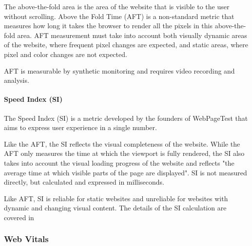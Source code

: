 The above-the-fold area is the area of the website that is visible to the user without scrolling.
Above the Fold Time (AFT) is a non-standard metric that measures how long it takes the browser to render all the pixels in this above-the-fold area. %
AFT measurement must take into account both visually dynamic areas of the website, where frequent pixel changes are expected, and static areas, where pixel and color changes are not expected. %

AFT is measurable by synthetic monitoring and requires video recording and analysis. %


\paragraph{Speed Index (SI)} %

The Speed Index (SI) is a metric developed by the founders of WebPageTest that aims to express user experience in a single number. %

Like the AFT, the SI reflects the visual completeness of the website.
While the AFT only measures the time at which the viewport is fully rendered, the SI also takes into account the visual loading progress of the website and reflects "the average time at which visible parts of the page are displayed". %
SI is not measured directly, but calculated and expressed in milliseconds. %

Like AFT, SI is reliable for static websites and unreliable for websites with dynamic and changing visual content. %
The details of the SI calculation are covered in %



\subsubsection{Web Vitals} %
\label{subsubsection:web_vitals}

